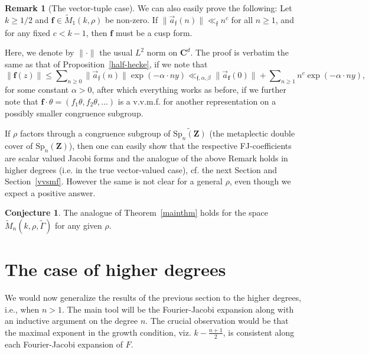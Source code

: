 \documentclass[12pt]{amsart}
\numberwithin{equation}{section}
\theoremstyle{plain}
\newcommand{\thmref}[1]{Theorem~\ref{#1}}
\newcommand{\propref}[1]{Proposition~\ref{#1}}
\theoremstyle{definition}
\newtheorem{rmk}[thm]{Remark}
\newtheorem{conj}[thm]{Conjecture}
\newcommand{\mf}{\mathbf}
\newcommand{\mk}{\mathfrak}
\newcommand{\mrm}{\mathrm}
\newcommand{\spn}{\mrm{Sp}_n(\mf Z)}
\newcommand{\sumn}{\sum \nolimits}
\begin{document}
\begin{rmk}[The vector-tuple case]
We can also easily prove the following:
   Let $ k \geq 1/2$ and  $\mf f \in \widetilde{M}_1(k,\rho)$  be non-zero. If $\| \overset{\rightarrow}{a}_{\mk f}(n) \| \ll_{\mk f} n^{c}$ for all $n \ge 1$, and for any fixed $ c < k-1$, then $\mf f$ must be a cusp form.

Here, we denote by $\| \cdot \|$ the usual $L^2$ norm on $\mf C^d$.
The proof is verbatim the same as that of \propref{half-hecke}, if we note that
\[  \| \mf f(z) \| \le \sumn_{n \ge 0} \| \overset{\rightarrow}{a}_{\mk f}(n) \|  \exp(- \alpha \cdot ny) \ll_{\mk f, \alpha, \beta} \| \overset{\rightarrow}{a}_{\mf f}(0) \| + \sumn_{n \ge 1} n^c \exp(- \alpha \cdot ny),\]
for some constant $\alpha>0$, after which everything works as before, if we further note that $\mf f \cdot \theta = (f_1 \theta, f_2\theta, \ldots)$ is a v.v.m.f. for another representation on a possibly smaller congruence subgroup.
\end{rmk}

If $\rho$ factors through a congruence subgroup of $\widetilde{\spn}$ (the metaplectic double cover of $\spn$), then one can easily show that the respective FJ-coefficients are scalar valued Jacobi forms and the analogue of the above Remark holds in higher degrees (i.e. in the true vector-valued case), cf. the next Section and Section~\ref{vvsmf}. However the same is not clear for a general $\rho$, even though we expect a positive answer.

\begin{conj}
    The analogue of \thmref{mainthm} holds for the space $\widetilde{M}_n(k,\rho, \widetilde{\Gamma})$ for any given $\rho$.
\end{conj}

\section{The case of higher degrees}
We would now generalize the  results of the previous section to the higher degrees, i.e., when $n>1$. The main tool will be the Fourier-Jacobi expansion along with an inductive argument on the degree $n$. The crucial observation would be that the maximal exponent in the growth condition, viz. $\displaystyle k-\frac{n+1}{2}$, is consistent along each Fourier-Jacobi expansion of $F$.
\end{document}
